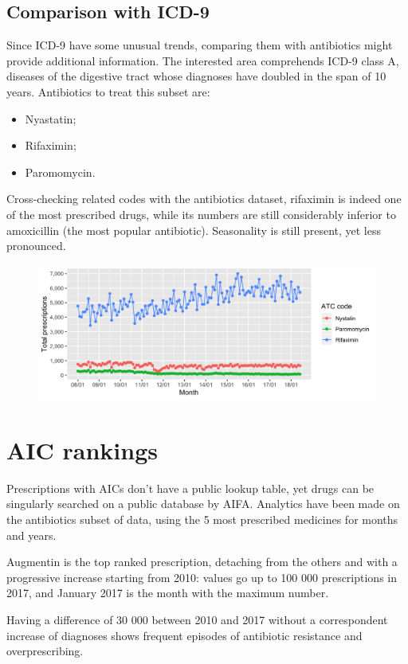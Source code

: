 \subsection{Comparison with ICD-9}
Since ICD-9 have some unusual trends, comparing them with antibiotics might provide additional information. The interested area comprehends ICD-9 class A, diseases of the digestive tract whose diagnoses have doubled in the span of 10 years. Antibiotics to treat this subset are:
\begin{itemize}
	\item Nyastatin;
	\item Rifaximin;
	\item Paromomycin.
\end{itemize}

Cross-checking related codes with the antibiotics dataset, rifaximin is indeed one of the most prescribed drugs, while its numbers are still considerably inferior to amoxicillin (the most popular antibiotic). Seasonality is still present, yet less pronounced. 

\begin{figure}[h]
	\centering
	\includegraphics[scale=0.3]{../plots/top_atc_a-month.png}
\end{figure}

\section{AIC rankings}
Prescriptions with AICs don't have a public lookup table, yet drugs can be singularly searched on a public database by AIFA. Analytics have been made on the antibiotics subset of data, using the 5 most prescribed medicines for months and years.

Augmentin is the top ranked prescription, detaching from the others and with a progressive increase starting from 2010: values go up to 100 000 prescriptions in 2017, and January 2017 is the month with the maximum number.

Having a difference of 30 000 between 2010 and 2017 without a correspondent increase of diagnoses shows frequent episodes of antibiotic resistance and overprescribing.

